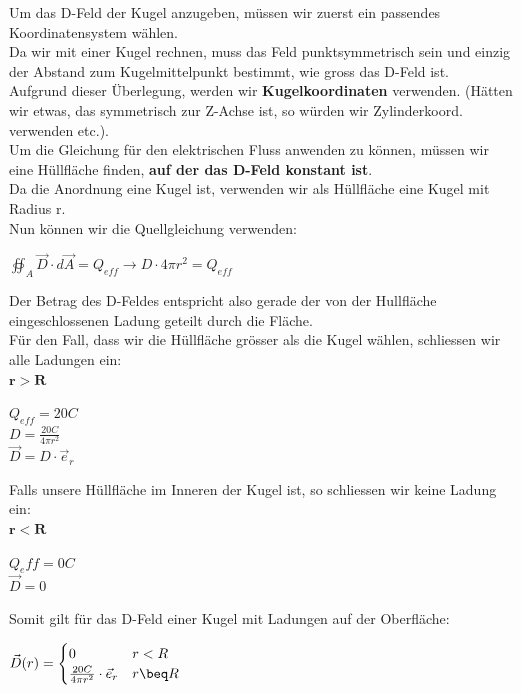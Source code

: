 \beginbsp
Um das D-Feld der Kugel anzugeben, müssen wir zuerst ein passendes Koordinatensystem wählen. \\
Da wir mit einer Kugel rechnen, muss das Feld punktsymmetrisch sein und einzig der Abstand zum Kugelmittelpunkt bestimmt, wie gross das D-Feld ist. \\
Aufgrund dieser Überlegung, werden wir \textbf{Kugelkoordinaten} verwenden. (Hätten wir etwas, das symmetrisch zur Z-Achse ist, so würden wir Zylinderkoord. verwenden etc.). \\
Um die Gleichung für den elektrischen Fluss anwenden zu können, müssen wir eine Hüllfläche finden,   \textbf{auf der das D-Feld konstant ist}. \\
Da die Anordnung eine Kugel ist, verwenden wir als Hüllfläche eine Kugel mit Radius r. \\
Nun können wir die Quellgleichung verwenden:
\begin{center}
	$ \oiint_A \vec{D}\cdot d\vec{A} = Q_{eff} \rightarrow D \cdot  4\pi r^2  = Q_{eff} $
\end{center}
Der Betrag des D-Feldes entspricht also gerade der von der Hullfläche eingeschlossenen Ladung geteilt durch die Fläche. \\
Für den Fall, dass wir die Hüllfläche grösser als die Kugel wählen, schliessen wir alle Ladungen ein: \\
$\mathbf{r > R}$ \\
\begin{center}
	$Q_{eff} = 20C$ \\
	$D = \frac{20C}{4\pi r^2}$ \\
	$\vec{D} = D \cdot \vec{e}_r$
\end{center}

Falls unsere Hüllfläche im Inneren der Kugel ist, so schliessen wir keine Ladung ein: \\
$\mathbf{r < R}$ \\
\begin{center}
	$Q_eff = 0C$ \\
	$\vec{D} = 0$
\end{center}

Somit gilt für das D-Feld einer Kugel mit Ladungen auf der Oberfläche: \\
\begin{center}

	$ \displaystyle
	\vec{D}(r) =
	\begin{cases}
		0                                       & r < R \\
		\frac{20 C}{4 \pi r^2} \cdot  \vec{e}_r & r \beq R \\
	\end{cases}$

\end{center}
\iend



